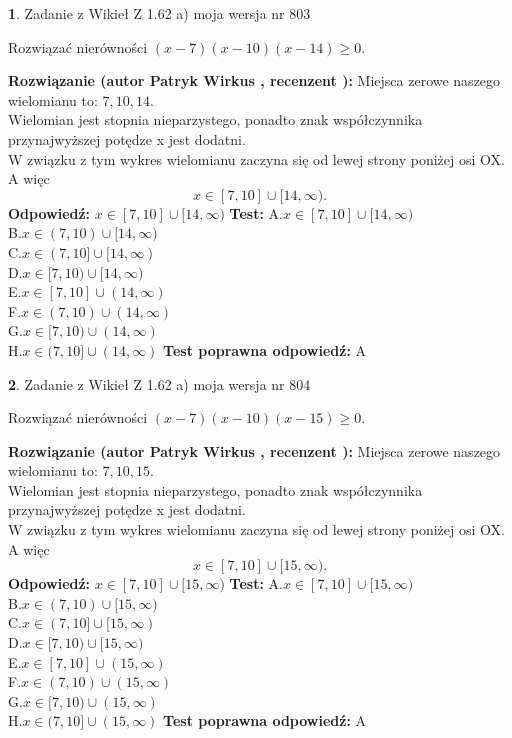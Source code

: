 \documentclass[12pt, a4paper]{article}
\theoremstyle{definition} %
\newtheorem{zad}{}
\newcommand{\zadStart}[1]{\begin{zad}#1\newline}
\newcommand{\zadStop}{\end{zad}}
\newcommand{\rozwStart}[2]{\noindent \textbf{Rozwiązanie (autor #1 , recenzent #2): }\newline}
\newcommand{\rozwStop}{\newline}
\newcommand{\odpStart}{\noindent \textbf{Odpowiedź:}\newline}
\newcommand{\odpStop}{\newline}
\newcommand{\testStart}{\noindent \textbf{Test:}\newline}
\newcommand{\testStop}{\newline}
\newcommand{\kluczStart}{\noindent \textbf{Test poprawna odpowiedź:}\newline}
\newcommand{\kluczStop}{\newline}
\begin{document}
\zadStart{Zadanie z Wikieł Z 1.62 a) moja wersja nr 803}

Rozwiązać nierówności $(x-7)(x-10)(x-14)\ge0$.
\zadStop
\rozwStart{Patryk Wirkus}{}
Miejsca zerowe naszego wielomianu to: $7, 10, 14$.\\
Wielomian jest stopnia nieparzystego, ponadto znak współczynnika przy\linebreak najwyższej potędze x jest dodatni.\\ W związku z tym wykres wielomianu zaczyna się od lewej strony poniżej osi OX. A więc $$x \in [7,10] \cup [14,\infty).$$
\rozwStop
\odpStart
$x \in [7,10] \cup [14,\infty)$
\odpStop
\testStart
A.$x \in [7,10] \cup [14,\infty)$\\
B.$x \in (7,10) \cup [14,\infty)$\\
C.$x \in (7,10] \cup [14,\infty)$\\
D.$x \in [7,10) \cup [14,\infty)$\\
E.$x \in [7,10] \cup (14,\infty)$\\
F.$x \in (7,10) \cup (14,\infty)$\\
G.$x \in [7,10) \cup (14,\infty)$\\
H.$x \in (7,10] \cup (14,\infty)$
\testStop
\kluczStart
A
\kluczStop



\zadStart{Zadanie z Wikieł Z 1.62 a) moja wersja nr 804}

Rozwiązać nierówności $(x-7)(x-10)(x-15)\ge0$.
\zadStop
\rozwStart{Patryk Wirkus}{}
Miejsca zerowe naszego wielomianu to: $7, 10, 15$.\\
Wielomian jest stopnia nieparzystego, ponadto znak współczynnika przy\linebreak najwyższej potędze x jest dodatni.\\ W związku z tym wykres wielomianu zaczyna się od lewej strony poniżej osi OX. A więc $$x \in [7,10] \cup [15,\infty).$$
\rozwStop
\odpStart
$x \in [7,10] \cup [15,\infty)$
\odpStop
\testStart
A.$x \in [7,10] \cup [15,\infty)$\\
B.$x \in (7,10) \cup [15,\infty)$\\
C.$x \in (7,10] \cup [15,\infty)$\\
D.$x \in [7,10) \cup [15,\infty)$\\
E.$x \in [7,10] \cup (15,\infty)$\\
F.$x \in (7,10) \cup (15,\infty)$\\
G.$x \in [7,10) \cup (15,\infty)$\\
H.$x \in (7,10] \cup (15,\infty)$
\testStop
\kluczStart
A
\kluczStop
\end{document}
